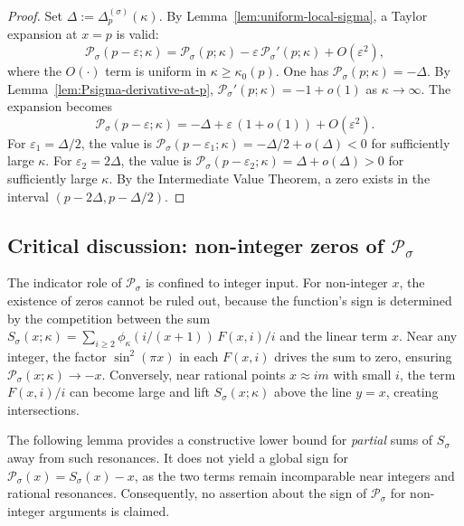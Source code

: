 \begin{proof}
Set $\Delta:=\Delta_p^{(\sigma)}(\kappa)$. By Lemma~\ref{lem:uniform-local-sigma}, a Taylor expansion at $x=p$ is valid:
\[
\mathcal P_\sigma(p-\varepsilon;\kappa)=\mathcal P_\sigma(p;\kappa) - \varepsilon\,\mathcal P_\sigma'(p;\kappa) + O(\varepsilon^2),
\]
where the $O(\cdot)$ term is uniform in $\kappa\ge\kappa_0(p)$. One has $\mathcal P_\sigma(p;\kappa)=-\Delta$. By Lemma~\ref{lem:Psigma-derivative-at-p}, $\mathcal P_\sigma'(p;\kappa)=-1+o(1)$ as $\kappa\to\infty$. The expansion becomes
\[
\mathcal P_\sigma(p-\varepsilon;\kappa)=-\Delta + \varepsilon\,(1+o(1)) + O(\varepsilon^2).
\]
For $\varepsilon_1=\Delta/2$, the value is $\mathcal P_\sigma(p-\varepsilon_1;\kappa)=-\Delta/2+o(\Delta)<0$ for sufficiently large $\kappa$.
For $\varepsilon_2=2\Delta$, the value is $\mathcal P_\sigma(p-\varepsilon_2;\kappa)=\Delta+o(\Delta)>0$ for sufficiently large $\kappa$.
By the Intermediate Value Theorem, a zero exists in the interval $(p-2\Delta, p-\Delta/2)$.
\end{proof}


\subsection{Critical discussion: non-integer zeros of $\mathcal{P}_{\sigma}$}
The indicator role of $\mathcal{P}_{\sigma}$ is confined to integer input. For non-integer $x$, the existence of zeros cannot be ruled out, because the function's sign is determined by the competition between the sum $S_{\sigma}(x;\kappa) = \sum_{i\ge2}\phi_{\kappa}(i/(x+1))\,F(x,i)/i$ and the linear term $x$. Near any integer, the factor $\sin^2(\pi x)$ in each $F(x,i)$ drives the sum to zero, ensuring $\mathcal{P}_{\sigma}(x;\kappa) \to -x$. Conversely, near rational points $x \approx im$ with small $i$, the term $F(x,i)/i$ can become large and lift $S_{\sigma}(x;\kappa)$ above the line $y=x$, creating intersections.

The following lemma provides a constructive lower bound for \emph{partial} sums of $S_{\sigma}$ away from such resonances. It does not yield a global sign for $\mathcal{P}_\sigma(x)=S_\sigma(x)-x$, as the two terms remain incomparable near integers and rational resonances. Consequently, no assertion about the sign of $\mathcal{P}_\sigma$ for non-integer arguments is claimed.

